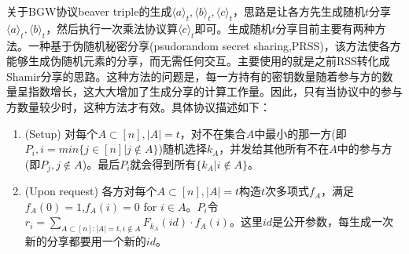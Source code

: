 \documentclass[UTF8]{ctexart}
\theoremstyle{nonumberplain}
\theoremstyle{plain}
\begin{document}
关于BGW协议beaver triple的生成$\langle a\rangle_t,\langle b\rangle_t,\langle c\rangle_t$，思路是让各方先生成随机$t$分享$\langle a\rangle_t,\langle b\rangle_t$，然后执行一次乘法协议算$\langle c\rangle_t$即可。生成随机$t$分享目前主要有两种方法。一种基于伪随机秘密分享(psudorandom secret sharing,PRSS)\cite{DBLP:conf/tcc/CramerDI05}，该方法使各方能够生成伪随机元素的分享，而无需任何交互。主要使用的就是之前RSS转化成Shamir分享的思路。这种方法的问题是，每一方持有的密钥数量随着参与方的数量呈指数增长，这大大增加了生成分享的计算工作量。因此，只有当协议中的参与方数量较少时，这种方法才有效。具体协议描述如下：
\begin{enumerate}
\item (Setup) 对每个$A\subset [n],|A|=t$，对不在集合$A$中最小的那一方(即$P_i, i=min\{j\in [n]|j\notin A\}$)随机选择$k_A$，并发给其他所有不在$A$中的参与方(即$P_j,j\notin A$)。最后$P_i$就会得到所有$\{k_A|i\notin A\}$。
\item (Upon request) 各方对每个$A\subset [n],|A|=t$构造$t$次多项式$f_A$，满足$f_A(0)=1$,$f_A(i)=0$ for $i\in A$。$P_i$令$r_i=\sum_{A\subset [n]:|A|=t,i\notin A}F_{k_A}(id)\cdot f_A(i)$。这里$id$是公开参数，每生成一次新的分享都要用一个新的$id$。
\end{enumerate}
\end{document}
